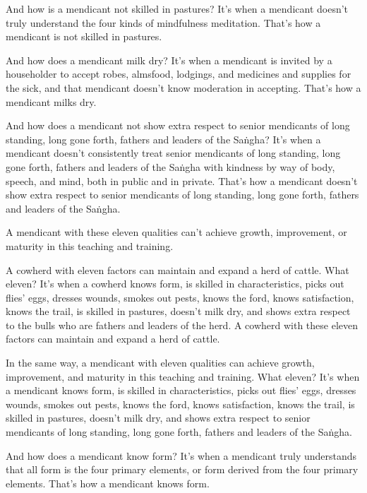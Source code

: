 \documentclass[12pt,openany]{book}%
\begin{document}
And how is a mendicant not skilled in pastures? It’s when a mendicant doesn’t truly understand the four kinds of mindfulness meditation. That’s how a mendicant is not skilled in pastures. 

And how does a mendicant milk dry? It’s when a mendicant is invited by a householder to accept robes, almsfood, lodgings, and medicines and supplies for the sick, and that mendicant doesn’t know moderation in accepting. That’s how a mendicant milks dry. 

And how does a mendicant not show extra respect to senior mendicants of long standing, long gone forth, fathers and leaders of the \textsanskrit{Saṅgha}? It’s when a mendicant doesn’t consistently treat senior mendicants of long standing, long gone forth, fathers and leaders of the \textsanskrit{Saṅgha} with kindness by way of body, speech, and mind, both in public and in private. That’s how a mendicant doesn’t show extra respect to senior mendicants of long standing, long gone forth, fathers and leaders of the \textsanskrit{Saṅgha}. 

A mendicant with these eleven qualities can’t achieve growth, improvement, or maturity in this teaching and training. 

A cowherd with eleven factors can maintain and expand a herd of cattle. What eleven? It’s when a cowherd knows form, is skilled in characteristics, picks out flies’ eggs, dresses wounds, smokes out pests, knows the ford, knows satisfaction, knows the trail, is skilled in pastures, doesn’t milk dry, and shows extra respect to the bulls who are fathers and leaders of the herd. A cowherd with these eleven factors can maintain and expand a herd of cattle. 

In the same way, a mendicant with eleven qualities can achieve growth, improvement, and maturity in this teaching and training. What eleven? It’s when a mendicant knows form, is skilled in characteristics, picks out flies’ eggs, dresses wounds, smokes out pests, knows the ford, knows satisfaction, knows the trail, is skilled in pastures, doesn’t milk dry, and shows extra respect to senior mendicants of long standing, long gone forth, fathers and leaders of the \textsanskrit{Saṅgha}. 

And how does a mendicant know form? It’s when a mendicant truly understands that all form is the four primary elements, or form derived from the four primary elements. That’s how a mendicant knows form. 
\end{document}
